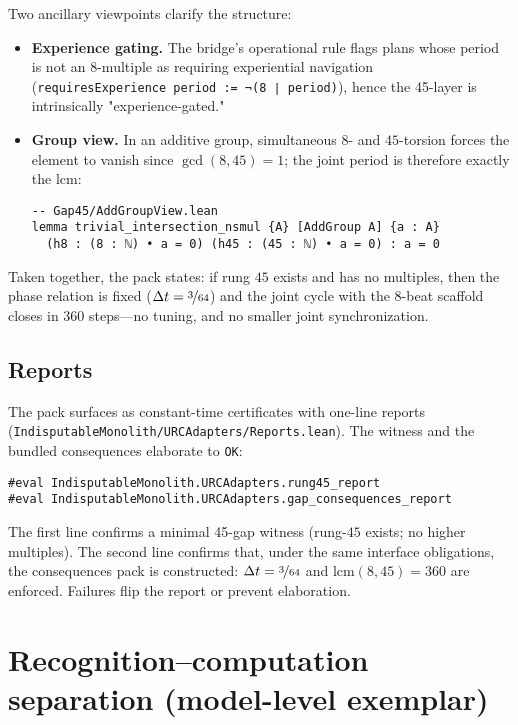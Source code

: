 \documentclass[11pt,a4paper,twoside]{article}
\numberwithin{equation}{section}
\theoremstyle{customthm}
\theoremstyle{customdef}
\theoremstyle{customrem}
\begin{document}
Two ancillary viewpoints clarify the structure:
\begin{itemize}[leftmargin=*]
  \item \textbf{Experience gating.} The bridge's operational rule flags plans whose period is not an 8-multiple as requiring experiential navigation (\texttt{requiresExperience period := ¬(8 ∣ period)}), hence the 45-layer is intrinsically "experience-gated."
  \item \textbf{Group view.} In an additive group, simultaneous $8$- and $45$-torsion forces the element to vanish since $\gcd(8,45)=1$; the joint period is therefore exactly the $\mathrm{lcm}$:
\begin{lstlisting}
-- Gap45/AddGroupView.lean
lemma trivial_intersection_nsmul {A} [AddGroup A] {a : A}
  (h8 : (8 : ℕ) • a = 0) (h45 : (45 : ℕ) • a = 0) : a = 0
\end{lstlisting}
\end{itemize}

Taken together, the pack states: if rung $45$ exists and has no multiples, then the phase relation is fixed ($\Delta t=\nicefrac{3}{64}$) and the joint cycle with the $8$-beat scaffold closes in $360$ steps—no tuning, and no smaller joint synchronization.

\subsection{Reports}\label{subsec:gap45-reports}

The pack surfaces as constant-time certificates with one-line reports (\texttt{IndisputableMonolith/URCAdapters/Reports.lean}). The witness and the bundled consequences elaborate to \texttt{OK}:

\begin{lstlisting}
#eval IndisputableMonolith.URCAdapters.rung45_report
#eval IndisputableMonolith.URCAdapters.gap_consequences_report
\end{lstlisting}

\begin{resultbox}[Meaning]
The first line confirms a minimal 45-gap witness (rung-$45$ exists; no higher multiples). The second line confirms that, under the same interface obligations, the consequences pack is constructed: $\Delta t=\nicefrac{3}{64}$ and $\mathrm{lcm}(8,45)=360$ are enforced. Failures flip the report or prevent elaboration.
\end{resultbox}

\section{Recognition–computation separation (model-level exemplar)}\label{sec:pn-split}
\end{document}
